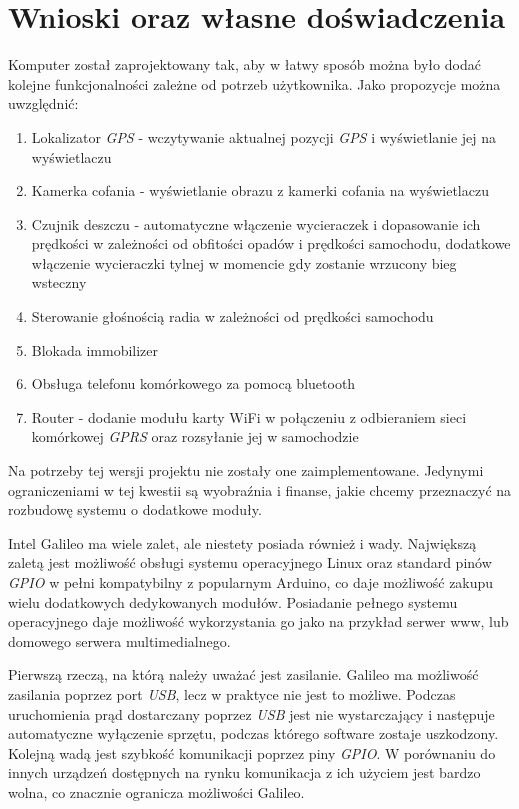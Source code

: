 \documentclass{xmgr}
\begin{document}
\section{Wnioski oraz własne doświadczenia}
Komputer został zaprojektowany tak, aby w łatwy sposób można było dodać kolejne funkcjonalności zależne od potrzeb użytkownika. Jako propozycje można uwzględnić:
\begin{enumerate}
	\item Lokalizator \emph{GPS} - wczytywanie aktualnej pozycji \emph{GPS} i wyświetlanie jej na wyświetlaczu
	\item Kamerka cofania - wyświetlanie obrazu z kamerki cofania na wyświetlaczu
	\item Czujnik deszczu - automatyczne włączenie wycieraczek i dopasowanie ich prędkości w zależności od obfitości opadów i prędkości samochodu, dodatkowe włączenie wycieraczki tylnej w momencie gdy zostanie wrzucony bieg wsteczny
	\item Sterowanie głośnością radia w zależności od prędkości samochodu
	\item Blokada immobilizer
	\item Obsługa telefonu komórkowego za pomocą bluetooth
	\item Router - dodanie modułu karty WiFi w połączeniu z odbieraniem sieci komórkowej \emph{GPRS} oraz rozsyłanie jej w samochodzie
\end{enumerate}
Na potrzeby tej wersji projektu nie zostały one zaimplementowane. Jedynymi ograniczeniami w tej kwestii są wyobraźnia i finanse, jakie chcemy przeznaczyć na rozbudowę systemu o dodatkowe moduły.

Intel Galileo ma wiele zalet, ale niestety posiada również i wady. Największą zaletą jest możliwość obsługi systemu operacyjnego Linux oraz standard pinów \emph{GPIO} w pełni kompatybilny z popularnym Arduino, co daje możliwość zakupu wielu dodatkowych dedykowanych modułów. Posiadanie pełnego systemu operacyjnego daje możliwość wykorzystania go jako na przykład serwer www, lub domowego serwera multimedialnego. 

Pierwszą rzeczą, na którą należy uważać jest zasilanie. Galileo ma możliwość zasilania poprzez port \emph{USB}, lecz w praktyce nie jest to możliwe. Podczas uruchomienia prąd dostarczany poprzez \emph{USB} jest nie wystarczający i następuje automatyczne wyłączenie sprzętu, podczas którego software zostaje uszkodzony. Kolejną wadą jest szybkość komunikacji poprzez piny \emph{GPIO}. W porównaniu do innych urządzeń dostępnych na rynku komunikacja z ich użyciem jest bardzo wolna, co znacznie ogranicza możliwości Galileo.
\end{document}
